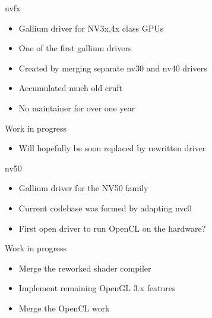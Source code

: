 \documentclass[11pt,english,compress]{beamer}
\begin{document}
		\begin{frame}
			\begin{block}{nvfx}
				\begin{itemize}
					\item Gallium driver for NV3x,4x class GPUs
					\item One of the first gallium drivers
					\item Created by merging separate nv30 and nv40 drivers
					\item Accumulated much old cruft
					\item No maintainer for over one year
				\end{itemize}
			\end{block}
			\begin{block}{Work in progress}
				\begin{itemize}
					\item Will hopefully be soon replaced by rewritten driver
				\end{itemize}
			\end{block}
		\end{frame}
		\begin{frame}
			\begin{block}{nv50}
				\begin{itemize}
					\item Gallium driver for the NV50 family
					\item Current codebase was formed by adapting nvc0
					\item First open driver to run OpenCL on the hardware?
				\end{itemize}
			\end{block}
			\begin{block}{Work in progress}
				\begin{itemize}
					\item Merge the reworked shader compiler
					\item Implement remaining OpenGL 3.x features
					\item Merge the OpenCL work
				\end{itemize}
			\end{block}
		\end{frame}
\end{document}
